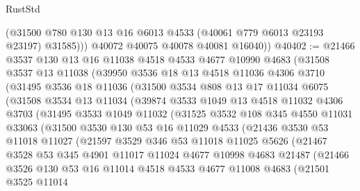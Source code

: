 \begin{lexlean}{RustStd}
\begin{coremodule}
            (@31500 @780 @130 @13 @16 @6013 @4533 (@40061 @779 @6013 @23193 @23197) @31585)))
        @40072
        @40075
        @40078
        @40081
        @16040))
@40402 := @21466
    @3537
    @130
    @13
    @16
    @11038
    @4518
    @4533
    @4677
    @10990
    @4683
    (@31508
      @3537
      @13
      @11038
      (@39950
        @3536
        @18
        @13
        @4518
        @11036
        @4306
        @3710
        (@31495
          @3536
          @18
          @11036
          (@31500
            @3534
            @808
            @13
            @17
            @11034
            @6075
            (@31508
              @3534
              @13
              @11034
              (@39874
                @3533
                @1049
                @13
                @4518
                @11032
                @4306
                @3703
                (@31495
                  @3533
                  @1049
                  @11032
                  (@31525
                    @3532
                    @108
                    @345
                    @4550
                    @11031
                    @33063
                    (@31500
                      @3530
                      @130
                      @53
                      @16
                      @11029
                      @4533
                      (@21436
                        @3530
                        @53
                        @11018
                        @11027
                        (@21597
                          @3529
                          @346
                          @53
                          @11018
                          @11025
                          @5626
                          (@21467
                            @3528
                            @53
                            @345
                            @4901
                            @11017
                            @11024
                            @4677
                            @10998
                            @4683
                            @21487
                            (@21466
                              @3526
                              @130
                              @53
                              @16
                              @11014
                              @4518
                              @4533
                              @4677
                              @11008
                              @4683
                              (@21501
                                @3525
                                @11014

\end{coremodule}
\end{lexlean}
